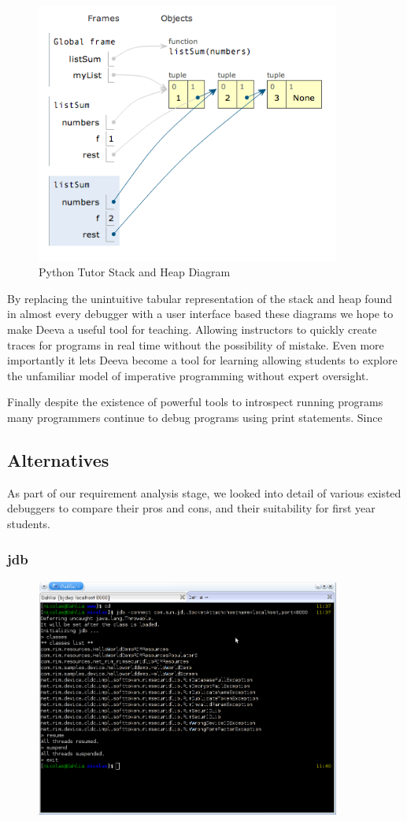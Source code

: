 \documentclass[11pt, a4paper]{article}
\begin{document}
\begin{figure}[h!]
\centering
\includegraphics[width=100mm]{PythonTutorStackHeap.png}
\caption{Python Tutor Stack and Heap Diagram}
\end{figure}

By replacing the unintuitive tabular representation of the stack and heap found in almost every debugger with a user interface based these diagrams we hope to make Deeva a useful tool for teaching.
Allowing instructors to quickly create traces for programs in real time without the possibility of mistake.
Even more importantly it lets Deeva become a tool for learning allowing students to explore the unfamiliar model of imperative programming without expert oversight.


Finally despite the existence of powerful tools to introspect running programs many programmers continue to debug programs using print statements.
Since



\subsection{Alternatives}
As part of our requirement analysis stage, we looked into detail of various existed debuggers to compare their pros and cons, and their suitability for first year students.

\subsubsection{jdb}
\begin{figure}[h!]
\centering
\includegraphics[width=100mm]{jdb.png}
\end{figure}
\end{document}
